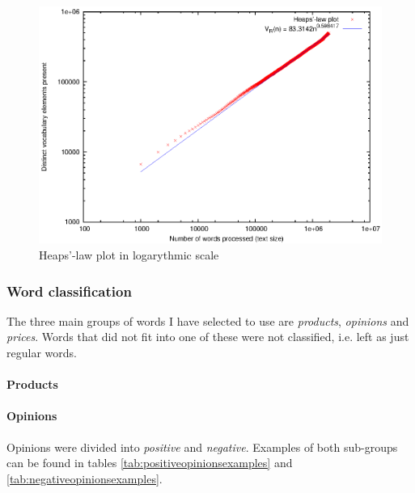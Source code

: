      \begin{figure}[H]
        \centering
        \includegraphics[width=\textwidth]{chapters/03_implementation/extraction_log}
        \caption{Heaps'-law plot in logarythmic scale}
        \label{fig:word_extraction_log}
      \end{figure}


    \subsubsection{Word classification}
    
      The three main groups of words I have selected to use are \emph{products}, \emph{opinions} and \emph{prices}. Words that did not fit into one of these were not classified, i.e. left as just regular words.
    
      \paragraph{Products}
      
      \paragraph{Opinions}
      
        Opinions were divided into \emph{positive} and \emph{negative}. Examples of both sub-groups can be found in tables \ref{tab:positiveopinionsexamples} and \ref{tab:negativeopinionsexamples}.
        
